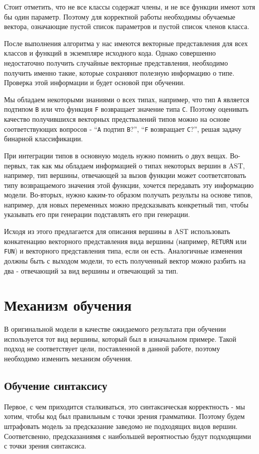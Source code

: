 \documentclass[times,specification,annotation]{itmo-student-thesis}
\begin{document}
Стоит отметить, что не все классы содержат члены, и не все функции имеют хотя бы один параметр. Поэтому для корректной работы необходимы обучаемые вектора, означающие пустой список параметров и пустой список членов класса.

После выполнения алгоритма у нас имеются векторные представления для всех классов и функций в экземпляре исходного кода. Однако совершенно недостаточно получить случайные векторные представления, необходимо получить именно такие, которые сохраняют полезную информацию о типе. Проверка этой информации и будет основой при обучении. 

Мы обладаем некоторыми знаниями о всех типах, например, что тип \texttt{A} является подтипом \texttt{B} или что функция \texttt{F} возвращает значение типа \texttt{C}. Поэтому оценивать качество получившихся векторных предствалений типов можно на основе соответствующих вопросов - ``\texttt{A} подтип \texttt{B}?'', ``\texttt{F} возвращает \texttt{C}?'', решая задачу бинарной классификации.

При интеграции типов в основную модель нужно помнить о двух вещах. Во-первых, так как мы обладаем информацией о типах некоторых вершин в AST, например, тип вершины, отвечающей за вызов функции может соответсвтовать типу возвращаемого значения этой функции, хочется передавать эту информацию модели. Во-вторых, нужно каким-то образом получать результы на основе типов, например, для новых переменных можно предсказывать конкретный тип, чтобы указывать его при генерации подставлять его при генерации.

Исходя из этого предлагается для описания вершины в AST использовать конкатенацию векторного представления вида вершины (например, \texttt{RETURN} или \texttt{FUN}) и векторного представления типа, если он есть. Аналогичные изменения должны быть с выходом модели, то есть полученный вектор можно разбить на два - отвечающий за вид вершины и отвечающий за тип.

\section{Механизм обучения}\label{fit}
В оригинальной модели в качестве ожидаемого результата при обучении используется тот вид вершины, который был в изначальном примере. Такой подход не соответствует цели, поставленной в данной работе, поэтому необходимо изменить механизм обучения.

\subsection{Обучение синтаксису}\label{fit:syntax}
Первое, с чем приходится сталкиваться, это синтаксическая корректность - мы хотим, чтобы код был правильным с точки зрения грамматики. Поэтому будем штрафовать модель за предсказание заведомо не подходящих видов вершин. Соответсвенно, предсказаниямя с наибольшей вероятностью будут подходящими с точки зрения синтаксиса. 
\end{document}
